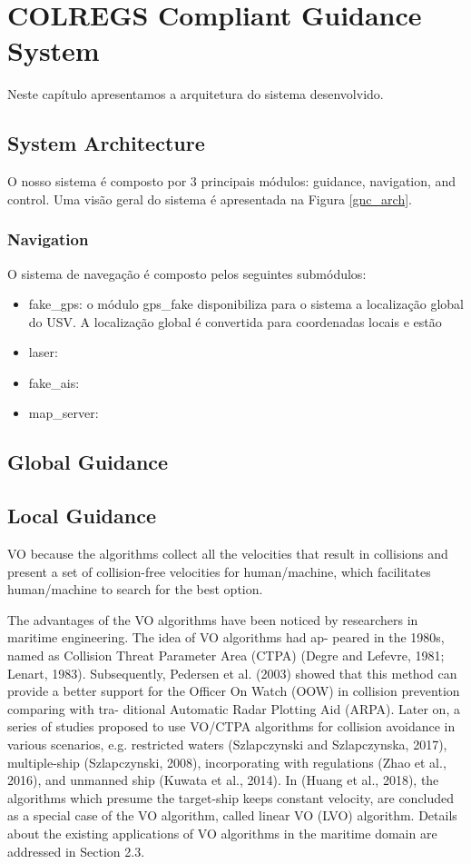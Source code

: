 \chapter{COLREGS Compliant Guidance System}
\label{chap:4_COLREGS_Compliant_Guidance_System}

Neste capítulo apresentamos a arquitetura do sistema desenvolvido.

\section{System Architecture}

O nosso sistema é composto por 3 principais módulos: guidance, navigation, and control. Uma visão geral do sistema é apresentada na Figura \ref{gnc_arch}.

\subsection{Navigation}
O sistema de navegação é composto pelos seguintes submódulos:

\begin{itemize}
    \item fake\_gps: o módulo gps\_fake disponibiliza para o sistema a localização global do \ac{USV}. A localização global é convertida para coordenadas locais e estão
    \item laser:
    \item fake\_ais:
    \item map\_server:
\end{itemize}

\section{Global Guidance}
\section{Local Guidance}
VO because the algorithms collect all the velocities that result in collisions and present a set of collision-free velocities for human/machine, which facilitates human/machine to search for the best option.

The advantages of the VO algorithms have been noticed by researchers in maritime engineering. The idea of VO algorithms had ap- peared in the 1980s, named as Collision Threat Parameter Area (CTPA) (Degre and Lefevre, 1981; Lenart, 1983). Subsequently, Pedersen et al. (2003) showed that this method can provide a better support for the Officer On Watch (OOW) in collision prevention comparing with tra- ditional Automatic Radar Plotting Aid (ARPA). Later on, a series of studies proposed to use VO/CTPA algorithms for collision avoidance in various scenarios, e.g. restricted waters (Szlapczynski and Szlapczynska, 2017), multiple-ship (Szlapczynski, 2008), incorporating with regulations (Zhao et al., 2016), and unmanned ship (Kuwata et al., 2014). In (Huang et al., 2018), the algorithms which presume the target-ship keeps constant velocity, are concluded as a special case of the VO algorithm, called linear VO (LVO) algorithm. Details about the existing applications of VO algorithms in the maritime domain are addressed in Section 2.3.
